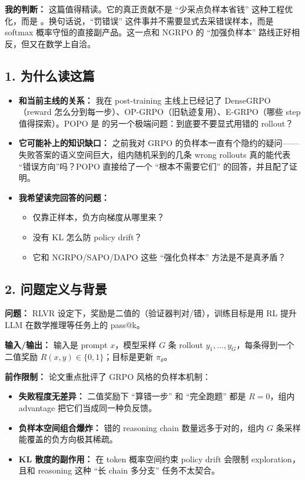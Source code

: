 \begin{summarybox}
\textbf{我的判断：} 这篇值得精读。它的真正贡献不是 ``少采点负样本省钱'' 这种工程优化，而是 。换句话说，``罚错误'' 这件事并不需要显式去采错误样本，而是 softmax 概率守恒的直接副产品。这一点和 NGRPO 的 ``加强负样本'' 路线正好相反，但又在数学上自洽。
\end{summarybox}

\subsection{1. 为什么读这篇}

\begin{itemize}[leftmargin=1.5em]
  \item \textbf{和当前主线的关系：} 我在 post-training 主线上已经记了 DenseGRPO（reward 怎么分到每一步）、OP-GRPO（旧轨迹复用）、E-GRPO（哪些 step 值得探索）。POPO 是  的另一个极端问题：到底要不要显式用错的 rollout？
  \item \textbf{它可能补上的知识缺口：} 之前我对 GRPO 的负样本一直有个隐约的疑问——失败答案的语义空间巨大，组内随机采到的几条 wrong rollouts 真的能代表 ``错误方向''吗？POPO 直接给了一个 ``根本不需要它们'' 的回答，并且配了证明。
  \item \textbf{我希望读完回答的问题：}
  \begin{itemize}[leftmargin=1.5em]
    \item 仅靠正样本，负方向梯度从哪里来？
    \item 没有 KL 怎么防 policy drift？
    \item 它和 NGRPO/SAPO/DAPO 这些 ``强化负样本'' 方法是不是真矛盾？
  \end{itemize}
\end{itemize}

\subsection{2. 问题定义与背景}

\textbf{问题：} RLVR 设定下，奖励是二值的（验证器判对/错），训练目标是用 RL 提升 LLM 在数学推理等任务上的 pass@k。

\textbf{输入/输出：} 输入是 prompt $x$，模型采样 $G$ 条 rollout $y_1,\ldots,y_G$，每条得到一个二值奖励 $R(x,y)\in\{0,1\}$；目标是更新 $\pi_\theta$。

\textbf{前作限制：} 论文重点批评了 GRPO 风格的负样本机制：

\begin{itemize}[leftmargin=1.5em]
  \item \textbf{失败程度无差异：} 二值奖励下 ``算错一步'' 和 ``完全跑题'' 都是 $R=0$，组内 advantage 把它们当成同一种负反馈。
  \item \textbf{负样本空间组合爆炸：} 错的 reasoning chain 数量远多于对的，组内 $G$ 条采样能覆盖的负方向极其稀疏。
  \item \textbf{KL 散度的副作用：} 在 token 概率空间约束 policy drift 会限制 exploration，且和 reasoning 这种 ``长 chain 多分支'' 任务不太契合。
\end{itemize}

